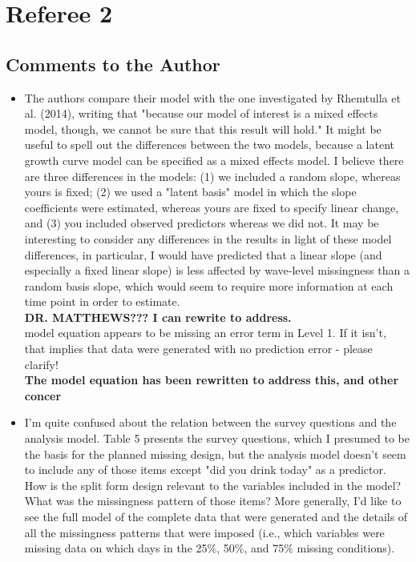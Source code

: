 \documentclass[letterpaper,12pt]{article}\usepackage[]{graphicx}\usepackage[]{color}
\begin{document}
\section{Referee 2}
\subsection{Comments to the Author}
\begin{itemize}

\item  The authors compare their model with the one investigated by Rhemtulla et al. (2014), writing that "because our model of interest is a mixed effects model, though, we cannot be sure that this result will hold." It might be useful to spell out the differences between the two models, because a latent growth curve model can be specified as a mixed effects model. I believe there are three differences in the models: (1) we included a random slope, whereas yours is fixed; (2) we used a "latent basis" model in which the slope coefficients were estimated, whereas yours are fixed to specify linear change, and (3) you included observed predictors whereas we did not. It may be interesting to consider any differences in the results in light of these model differences, in particular, I would have predicted that a linear slope (and especially a fixed linear slope) is less affected by wave-level missingness than a random basis slope, which would seem to require more information at each time point in order to estimate.\\

{\bf DR. MATTHEWS??? I can rewrite to address.}\\

\itemThe model equation appears to be missing an error term in Level 1. If it isn't, that implies that data were generated with no prediction error - please clarify!\\

{\bf The model equation has been rewritten to address this, and other concer}\\

\item I'm quite confused about the relation between the survey questions and the analysis model. Table 5 presents the survey questions, which I presumed to be the basis for the planned missing design, but the analysis model doesn't seem to include any of those items except "did you drink today" as a predictor. How is the split form design relevant to the variables included in the model? What was the missingness pattern of those items? More generally, I'd like to see the full model of the complete data that were generated and the details of all the missingness patterns that were imposed (i.e., which variables were missing data on which days in the 25\%, 50\%, and 75\% missing conditions).\\


\end{itemize}
\end{document}
